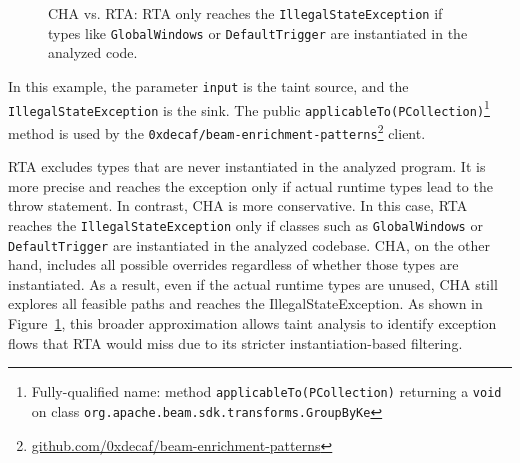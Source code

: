 \begin{figure}[t]
\centering
{}
\vspace{-1ex}
\caption{CHA vs. RTA: RTA only reaches the \texttt{IllegalStateException} if types like \texttt{GlobalWindows} or \texttt{DefaultTrigger} are instantiated in the analyzed code.}
\label{fig:rta-vs-cha}
\vspace{-2ex}
\end{figure}


In this example, the parameter \texttt{input} is the taint source, and the \texttt{IllegalStateException} is the sink. The public \texttt{applicableTo(PCollection)}\footnote{Fully-qualified name: method \texttt{applicableTo(PCollection)} returning a \texttt{void} on class \texttt{org.apache.beam.sdk.transforms.GroupByKe}} method is used by the \texttt{0xdecaf/beam-enrichment-patterns}\footnote{\url{github.com/0xdecaf/beam-enrichment-patterns}} client.

RTA excludes types that are never instantiated in the analyzed program. It is more precise and reaches the exception only if actual runtime types lead to the throw statement. In contrast, CHA is more conservative. In this case, RTA reaches the \texttt{IllegalStateException} only if classes such as \texttt{GlobalWindows} or \texttt{DefaultTrigger} are instantiated in the analyzed codebase. CHA, on the other hand, includes all possible overrides regardless of whether those types are instantiated. As a result, even if the actual runtime types are unused, CHA still explores all feasible paths and reaches the IllegalStateException. As shown in Figure~\ref{fig:rta-vs-cha}, this broader approximation allows taint analysis to identify exception flows that RTA would miss due to its stricter instantiation-based filtering.

